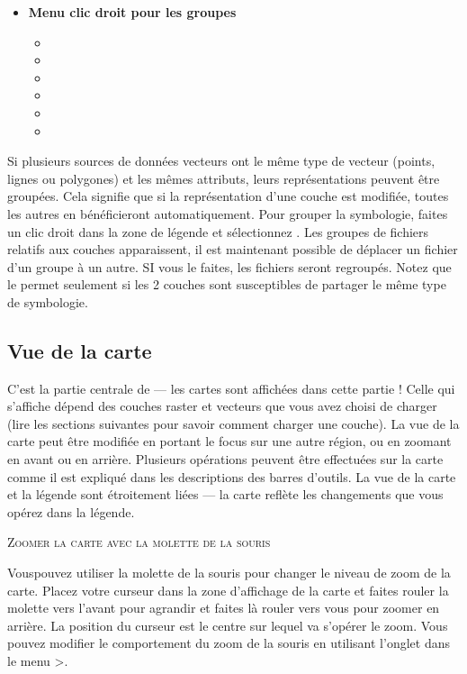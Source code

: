 \begin{itemize}[label=--]
\item \textbf{Menu clic droit pour les groupes} 
\begin{itemize}[label=--]
\item {}
\item {}
\item {}
\item {}
\item {}
\item {}
\end{itemize}

\end{itemize}

Si plusieurs sources de données vecteurs ont le même type de vecteur (points, lignes ou polygones) et les mêmes attributs, leurs représentations peuvent être groupées. Cela signifie que si la représentation d'une couche est modifiée, toutes les autres en bénéficieront automatiquement. Pour grouper la symbologie, faites un clic droit dans la zone de légende et sélectionnez . Les groupes de fichiers relatifs aux couches apparaissent, il est maintenant possible de déplacer un fichier d'un groupe à un autre. SI vous le faites, les fichiers seront regroupés. Notez que \qg le permet seulement si les 2 couches sont susceptibles de partager le même type de symbologie.

\subsection{Vue de la carte}\label{label_mapview}

C'est la partie centrale de \qg — les cartes sont affichées dans cette partie ! Celle qui s'affiche dépend des couches raster et vecteurs que vous avez choisi de charger (lire les sections suivantes pour savoir comment charger une couche). La vue de la carte peut être modifiée en portant le focus sur une autre région, ou en zoomant en avant ou en arrière. Plusieurs opérations peuvent être effectuées sur la carte comme il est expliqué dans les descriptions des barres d'outils. La vue de la carte et la légende sont étroitement liées — la carte reflète les changements que vous opérez dans la légende.

\begin{Astuce}\caption{\textsc{Zoomer la carte avec la molette de la souris}}
Vouspouvez utiliser la molette de la souris pour changer le niveau de zoom de la carte. Placez votre curseur dans la zone d'affichage de la carte et faites rouler la molette vers l'avant pour agrandir et faites là rouler vers vous pour zoomer en arrière. La position du curseur est le centre sur lequel va s'opérer le zoom. Vous pouvez modifier le comportement du zoom de la souris en utilisant l'onglet  dans le menu  >.
\end{Astuce}

